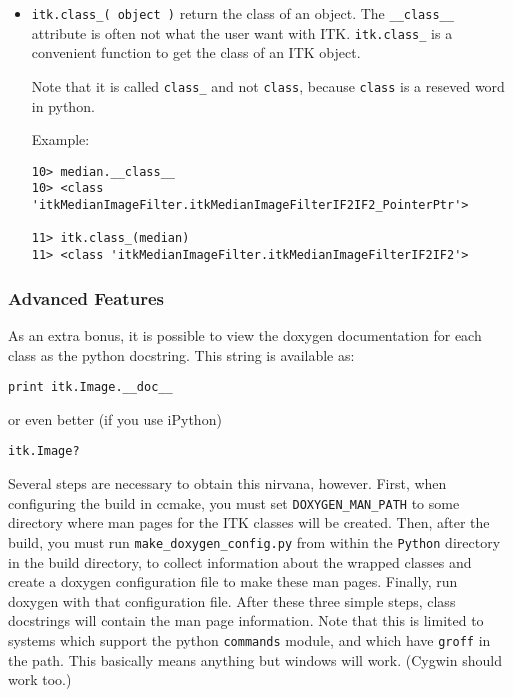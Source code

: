 \documentclass{InsightArticle}
\begin{document}
\begin{itemize}
  \item \verb$itk.class_( object )$ return the class of an object. The \verb$__class__$
attribute is often not what the user want with ITK. \verb$itk.class_$ is a convenient
function to get the class of an ITK object.

Note that it is called \verb$class_$ and not \verb$class$, because \verb$class$ is a
reseved word in python.

Example:
\begin{verbatim}
10> median.__class__
10> <class 'itkMedianImageFilter.itkMedianImageFilterIF2IF2_PointerPtr'>

11> itk.class_(median)
11> <class 'itkMedianImageFilter.itkMedianImageFilterIF2IF2'>
\end{verbatim}


\end{itemize}

     \subsubsection{Advanced Features}

As an extra bonus, it is possible to view the doxygen documentation for each
class as the python docstring. This string is available as:
\small \begin{verbatim}
print itk.Image.__doc__
\end{verbatim} \normalsize
or even better (if you use iPython)
\small \begin{verbatim}
itk.Image?
\end{verbatim} \normalsize

Several steps are necessary to obtain this nirvana, however. First, when
configuring the build in ccmake, you must set \verb$DOXYGEN_MAN_PATH$ to some directory
where man pages for the ITK classes will be created. Then, after the build, you
must run \verb$make_doxygen_config.py$ from within the \verb$Python$ directory in the build
directory, to collect information about the wrapped classes and create a doxygen
configuration file to make these man pages. Finally, run doxygen with that
configuration file. After these three simple steps, class docstrings will
contain the man page information. Note that this is limited to systems which
support the python \verb$commands$ module, and which have \verb$groff$ in the path. This
basically means anything but windows will work. (Cygwin should work too.)
\end{document}
